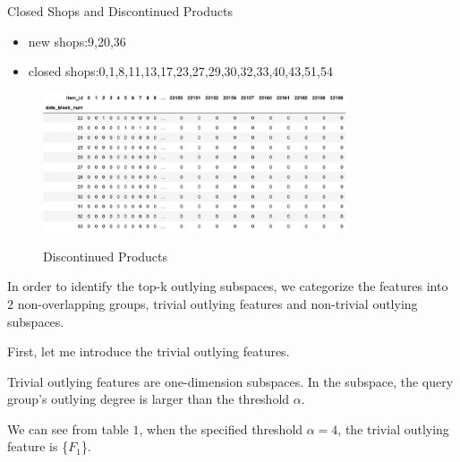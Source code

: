 \documentclass[
 size=12pt,
 paper=smartboard,  %
 mode=present, 		%
 display=slides, 	%
 style=tuliplab,  	%
 pauseslide,
 fleqn,leqno]{powerdot}
\begin{document}
\begin{slide}{Closed Shops and Discontinued Products}
\begin{itemize}
  \item
  \smallskip
  new shops:9,20,36 
  \item
  closed shops:0,1,8,11,13,17,23,27,29,30,32,33,40,43,51,54
\end{itemize}
\vspace{0.75cm}
\begin{figure}[htbp]
  \centering
  \includegraphics[width=0.8\textwidth,height=0.4\textwidth]{figures/Figure6.eps}\\
  \caption{Discontinued Products}
\end{figure}
  
  \begin{note}
  In order to identify the top-k outlying subspaces,
  we categorize the features into $2$ non-overlapping groups,
  trivial outlying features and non-trivial outlying subspaces.
  
  First, let me introduce the trivial outlying features.
  
  Trivial outlying features are one-dimension subspaces.
  In the subspace,
  the query group's outlying degree is larger than the threshold $\alpha$.
  
  We can see from table $1$,
  when the specified threshold $\alpha = 4$,
  the trivial outlying feature is \{$F_1$\}.
  \end{note}
  
  \end{slide}
  
  
\end{document}
